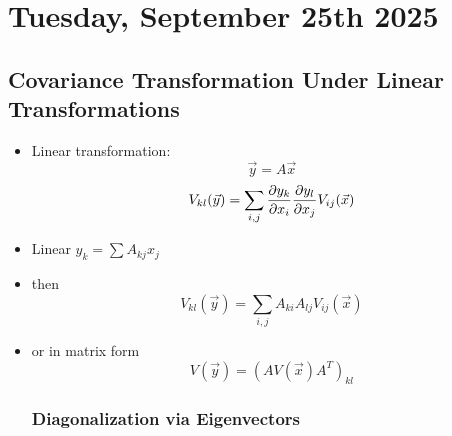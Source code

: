 \section{Tuesday, September 25th 2025}

\subsection{Covariance Transformation Under Linear Transformations}

\begin{itemize}
      \item Linear transformation:
            \[ \vec{y} = A\vec{x} \]
            \[ V_{kl}(\vec{y}) = \sum_{i,j} \pdv{y_k}{x_i} \pdv{y_l}{x_j} V_{ij}(\vec{x}) \]
      \item Linear $y_k = \sum A_{kj} x_j$
      \item then
            \[ V_{kl}(\vec{y}) = \sum_{i,j} A_{ki} A_{lj} V_{ij}(\vec{x}) \]
      \item or in matrix form
            \[ V(\vec{y}) = \left(A V(\vec{x}) A^T\right)_{kl} \]

            \subsubsection*{Diagonalization via Eigenvectors}


\end{itemize}
